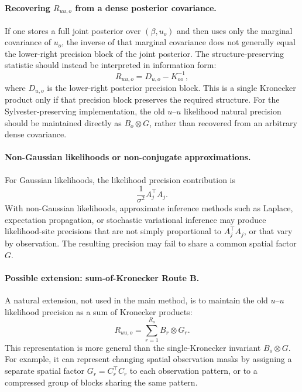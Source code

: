 \documentclass[12pt]{article}
\begin{document}
\paragraph{Recovering \(R_{uu,o}\) from a dense posterior covariance.}
If one stores a full joint posterior over \((\beta,u_o)\) and then uses only
the marginal covariance of \(u_o\), the inverse of that marginal covariance
does not generally equal the lower-right precision block of the joint
posterior. The structure-preserving statistic should instead be interpreted in
information form:
\begin{equation}
    R_{uu,o}=D_{u,o}-K_{oo}^{-1},
\end{equation}
where \(D_{u,o}\) is the lower-right posterior precision block. This is a
single Kronecker product only if that precision block preserves the required
structure. For the Sylvester-preserving implementation, the old $u$--$u$
likelihood natural precision should be maintained directly as \(B_o\otimes G\),
rather than recovered from an arbitrary dense covariance.

\paragraph{Non-Gaussian likelihoods or non-conjugate approximations.}
For Gaussian likelihoods, the likelihood precision contribution is
\begin{equation}
    \frac{1}{\sigma^2}A_j^\top A_j.
\end{equation}
With non-Gaussian likelihoods, approximate inference methods such as
Laplace, expectation propagation, or stochastic variational inference may
produce likelihood-site precisions that are not simply proportional to
\(A_j^\top A_j\), or that vary by observation. The resulting precision
may fail to share a common spatial factor \(G\).


\paragraph{Possible extension: sum-of-Kronecker Route B.}
A natural extension, not used in the main method, is to maintain the old
$u$--$u$ likelihood precision as a sum of Kronecker products:
\begin{equation}
    R_{uu,o}
    =
    \sum_{r=1}^{R_o} B_r\otimes G_r .
    \label{eq:app_sum_kron_ruu_old}
\end{equation}
This representation is more general than the single-Kronecker invariant
\(B_o\otimes G\).  For example, it can represent changing spatial
observation masks by assigning a separate spatial factor
\(G_r=C_r^\top C_r\) to each observation pattern, or to a compressed group
of blocks sharing the same pattern.
\end{document}
